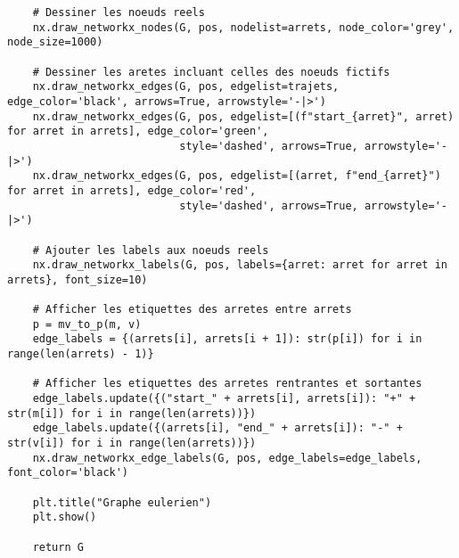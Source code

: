 \documentclass[12pt]{article}
\begin{document}
\begin{lstlisting}
    # Dessiner les noeuds reels
    nx.draw_networkx_nodes(G, pos, nodelist=arrets, node_color='grey', node_size=1000)

    # Dessiner les aretes incluant celles des noeuds fictifs
    nx.draw_networkx_edges(G, pos, edgelist=trajets, edge_color='black', arrows=True, arrowstyle='-|>')
    nx.draw_networkx_edges(G, pos, edgelist=[(f"start_{arret}", arret) for arret in arrets], edge_color='green',
                           style='dashed', arrows=True, arrowstyle='-|>')
    nx.draw_networkx_edges(G, pos, edgelist=[(arret, f"end_{arret}") for arret in arrets], edge_color='red',
                           style='dashed', arrows=True, arrowstyle='-|>')

    # Ajouter les labels aux noeuds reels
    nx.draw_networkx_labels(G, pos, labels={arret: arret for arret in arrets}, font_size=10)

    # Afficher les etiquettes des arretes entre arrets
    p = mv_to_p(m, v)
    edge_labels = {(arrets[i], arrets[i + 1]): str(p[i]) for i in range(len(arrets) - 1)}

    # Afficher les etiquettes des arretes rentrantes et sortantes
    edge_labels.update({("start_" + arrets[i], arrets[i]): "+" + str(m[i]) for i in range(len(arrets))})
    edge_labels.update({(arrets[i], "end_" + arrets[i]): "-" + str(v[i]) for i in range(len(arrets))})
    nx.draw_networkx_edge_labels(G, pos, edge_labels=edge_labels, font_color='black')

    plt.title("Graphe eulerien")
    plt.show()

    return G
\end{lstlisting}
\end{document}
